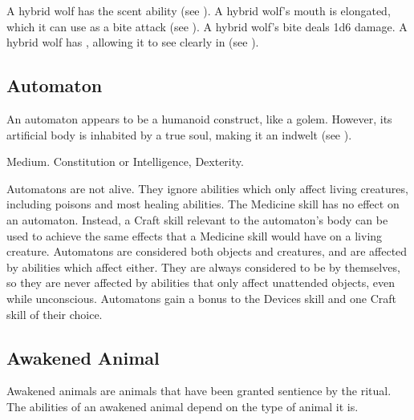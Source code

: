 
            \begin{itemize}
                 A hybrid wolf has the scent ability (see ).
                 A hybrid wolf's mouth is elongated, which it can use as a bite attack (see ).
                    A hybrid wolf's bite deals 1d6 damage.
                 A hybrid wolf has , allowing it to see clearly in  (see ).
            \end{itemize}

    \subsection{Automaton}
        An automaton appears to be a humanoid construct, like a golem.
        However, its artificial body is inhabited by a true soul, making it an indwelt (see ).

         Medium.
          Constitution or Intelligence,  Dexterity.
        \begin{itemize}
             Automatons are not alive. They ignore abilities which only affect living creatures, including poisons and most healing abilities.
             The Medicine skill has no effect on an automaton. Instead, a Craft skill relevant to the automaton's body can be used to achieve the same effects that a Medicine skill would have on a living creature.
             Automatons are considered both objects and creatures, and are affected by abilities which affect either.
                They are always considered to be  by themselves, so they are never affected by abilities that only affect unattended objects, even while unconscious.
             Automatons gain a  bonus to the Devices skill and one Craft skill of their choice.
        \end{itemize}

    \subsection{Awakened Animal}

        Awakened animals are animals that have been granted sentience by the  ritual.
        The abilities of an awakened animal depend on the type of animal it is.

